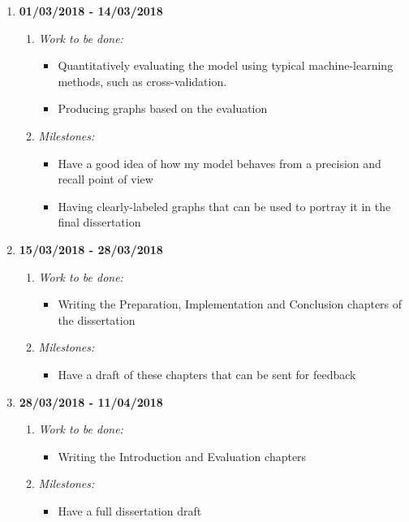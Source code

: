 \begin{enumerate}
	\item \textbf{01/03/2018 - 14/03/2018}
		\begin{enumerate}
			\item \emph{Work to be done:}
			\begin{itemize}
				\item Quantitatively evaluating the model using typical machine-learning methods, such as cross-validation. 
				\item Producing graphs based on the evaluation
			\end{itemize}
			\item \emph{Milestones:}
			\begin{itemize}
				\item Have a good idea of how my model behaves from a precision and recall point of view 
				\item Having clearly-labeled graphs that can be used to portray it in the final dissertation
			\end{itemize}
		\end{enumerate}
	
	\vspace{5mm}
	
	\item \textbf{15/03/2018 - 28/03/2018}
		\begin{enumerate}
			\item \emph{Work to be done:}
			\begin{itemize}
				\item Writing the Preparation, Implementation and Conclusion chapters of the dissertation
			\end{itemize}
			\item \emph{Milestones:}
			\begin{itemize}
				\item Have a draft of these chapters that can be sent for feedback
			\end{itemize}
		\end{enumerate}
	
	\vspace{5mm}

	\item \textbf{28/03/2018 - 11/04/2018}
	\begin{enumerate}
		\item \emph{Work to be done:}
		\begin{itemize}
			\item Writing the Introduction and Evaluation chapters
		\end{itemize}
		\item \emph{Milestones:}
		\begin{itemize}
			\item Have a full dissertation draft
		\end{itemize}
	\end{enumerate}
	

\end{enumerate}
